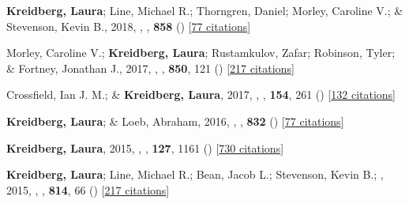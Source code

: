 \item[{\color{numcolor}\scriptsize10}] \textbf{Kreidberg, Laura}; Line, Michael R.; Thorngren, Daniel; Morley, Caroline V.; \& Stevenson, Kevin B., 2018, , \apj, \textbf{858} () [\href{https://ui.adsabs.harvard.edu/abs/2018ApJ...858L...6K}{77 citations}]

\item[{\color{numcolor}\scriptsize9}] Morley, Caroline V.; \textbf{Kreidberg, Laura}; Rustamkulov, Zafar; Robinson, Tyler; \& Fortney, Jonathan J., 2017, , \apj, \textbf{850}, 121 () [\href{https://ui.adsabs.harvard.edu/abs/2017ApJ...850..121M}{217 citations}]

\item[{\color{numcolor}\scriptsize8}] Crossfield, Ian J. M.; \& \textbf{Kreidberg, Laura}, 2017, , \aj, \textbf{154}, 261 () [\href{https://ui.adsabs.harvard.edu/abs/2017AJ....154..261C}{132 citations}]

\item[{\color{numcolor}\scriptsize7}] \textbf{Kreidberg, Laura}; \& Loeb, Abraham, 2016, , \apj, \textbf{832} () [\href{https://ui.adsabs.harvard.edu/abs/2016ApJ...832L..12K}{77 citations}]

\item[{\color{numcolor}\scriptsize6}] \textbf{Kreidberg, Laura}, 2015, , \pasp, \textbf{127}, 1161 () [\href{https://ui.adsabs.harvard.edu/abs/2015PASP..127.1161K}{730 citations}]

\item[{\color{numcolor}\scriptsize5}] \textbf{Kreidberg, Laura}; Line, Michael R.; Bean, Jacob L.; Stevenson, Kevin B.; \etal, 2015, , \apj, \textbf{814}, 66 () [\href{https://ui.adsabs.harvard.edu/abs/2015ApJ...814...66K}{217 citations}]

